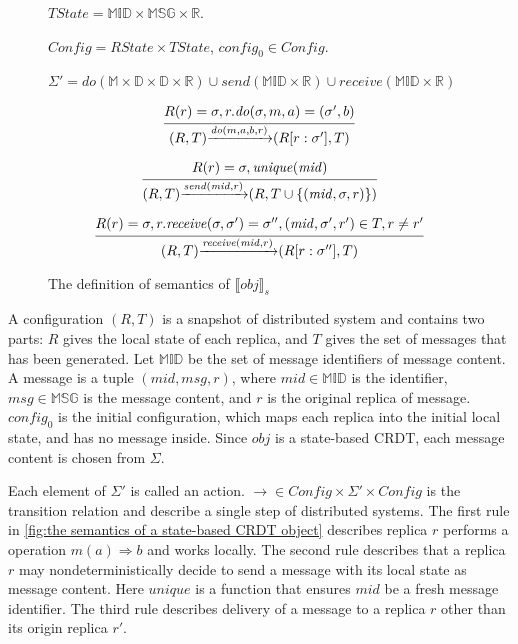{\begin{figure}[ht]
$\mathit{TState} = \mathbb{MID} \times \mathbb{MSG} \times \mathbb{R}$.

$\mathit{Config} = \mathit{RState} \times \mathit{TState}$, $\mathit{config}_0 \in \mathit{Config}$.

$\Sigma' = \mathit{do}(\mathbb{M} \times \mathbb{D} \times \mathbb{D} \times \mathbb{R}) \cup \mathit{send}(\mathbb{MID} \times \mathbb{R}) \cup \mathit{receive}(\mathbb{MID} \times \mathbb{R})$

\[
\begin{array}{l c}
\bigfrac{ R(r) = \sigma, r.\mathit{do}(\sigma,m,a) = (\sigma',b) }
{ (R,T) {\xrightarrow{\mathit{do}(m,a,b,r)}} (R[r:\sigma'],T) }
\end{array}
\]


\[
\begin{array}{l c}
\bigfrac{ R(r) = \sigma, \mathit{unique}(\mathit{mid}) }
{ (R,T) {\xrightarrow{\mathit{send}(\mathit{mid},r)}} (R,T \cup \{ (\mathit{mid},\sigma,r) \}) }
\end{array}
\]


\[
\begin{array}{l c}
\bigfrac{ R(r) = \sigma, r.\mathit{receive}(\sigma,\sigma') = \sigma'',(\mathit{mid},\sigma',r') \in T, r \neq r'}
{ (R,T) {\xrightarrow{\mathit{receive}(\mathit{mid},r)}} (R[r:\sigma''],T) }
\end{array}
\]
\caption{The definition of semantics of $\llbracket \mathit{obj} \rrbracket_s$}
\label{fig:the semantics of a state-based CRDT object}
\end{figure}

A configuration $(R,T)$ is a snapshot of distributed system and contains two parts: $R$ gives the local state of each replica, and $T$ gives the set of messages that has been generated. Let $\mathbb{MID}$ be the set of message identifiers of message content. A message is a tuple $(\mathit{mid},\mathit{msg},r)$, where $\mathit{mid} \in \mathbb{MID}$ is the identifier, $\mathit{msg} \in \mathbb{MSG}$ is the message content, and $r$ is the original replica of message. $\mathit{config}_0$ is the initial configuration, which maps each replica into the initial local state, and has no message inside. Since $\mathit{obj}$ is a state-based CRDT, each message content is chosen from $\Sigma$.

Each element of $\Sigma'$ is called an action. $\rightarrow \in \mathit{Config} \times \Sigma' \times \mathit{Config}$ is the transition relation and describe a single step of distributed systems. The first rule in \autoref{fig:the semantics of a state-based CRDT object} describes replica $r$ performs a operation $m(a) \Rightarrow b$ and works locally. The second rule describes that a replica $r$ may nondeterministically decide to send a message with its local state as message content. Here $\mathit{unique}$ is a function that ensures $\mathit{mid}$ be a fresh message identifier. The third rule describes delivery of a message to a replica $r$ other than its origin replica $r'$.

}
